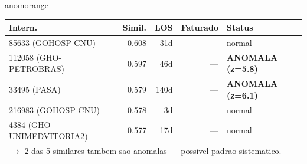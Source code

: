 \documentclass[a4paper,10pt]{article}
\begin{document}
\begin{anomalycard}[Internacao 162172 | GHO-PETROBRAS | ALTO (z=3.30)]{anomorange}
\begin{tabular}{l r r r l}\toprule\textbf{Intern.} & \textbf{Simil.} & \textbf{LOS} & \textbf{Faturado} & \textbf{Status} \\\midrule
85633 (GOHOSP-CNU) & 0.608 & 31d & --- & \textcolor{jcubeblue}{normal} \\
112058 (GHO-PETROBRAS) & 0.597 & 46d & --- & \textcolor{anomred}{\textbf{ANOMALA (z=5.8)}} \\
33495 (PASA) & 0.579 & 140d & --- & \textcolor{anomred}{\textbf{ANOMALA (z=6.1)}} \\
216983 (GOHOSP-CNU) & 0.578 & 3d & --- & \textcolor{jcubeblue}{normal} \\
4384 (GHO-UNIMEDVITORIA2) & 0.577 & 17d & --- & \textcolor{jcubeblue}{normal} \\
\multicolumn{5}{l}{\textcolor{anomred}{\small $\rightarrow$ 2 das 5 similares tambem sao anomalas --- possivel padrao sistematico.}} \\
\bottomrule\end{tabular}



\end{anomalycard}

\newpage
\end{document}
